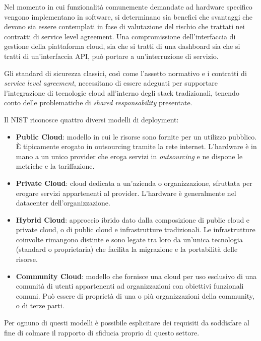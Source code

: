 \documentclass[../main.tex]{subfiles}
\begin{document}
Nel momento in cui funzionalità comunemente demandate ad hardware specifico vengono implementano in software, si determinano sia benefici che svantaggi che devono sia essere contemplati in fase di valutazione del rischio che trattati nei contratti di service level agreement. Una compromissione dell'interfaccia di gestione della piattaforma cloud, sia che si tratti di una dashboard sia che si tratti di un'interfaccia API, può portare a un'interruzione di servizio.

Gli standard di sicurezza classici, così come l'assetto normativo e i contratti di \textit{service level agreement}, necessitano di essere adeguati per supportare l'integrazione di tecnologie cloud all'interno degli stack tradizionali, tenendo conto delle problematiche di \textit{shared responsability} presentate.

Il NIST \cite{NISTCloud} riconosce quattro diversi modelli di deployment:
\begin{itemize}
    \item \textbf{Public Cloud}: modello in cui le risorse sono fornite per un utilizzo pubblico. È tipicamente erogato in outsourcing tramite la rete internet. L'hardware è in mano a un unico provider che eroga servizi in \textit{outsourcing} e ne dispone le metriche e la tariffazione.
    \item \textbf{Private Cloud}: cloud dedicata a un'azienda o organizzazione, sfruttata per erogare servizi appartenenti al provider. L'hardware è generalmente nel datacenter dell'organizzazione.
    \item \textbf{Hybrid Cloud}: approccio ibrido dato dalla composizione di public cloud e private cloud, o di public cloud e infrastrutture tradizionali. Le infrastrutture coinvolte rimangono distinte e sono legate tra loro da un'unica tecnologia (standard o proprietaria) che facilita la migrazione e la portabilità delle risorse.
    \item \textbf{Community Cloud}: modello che fornisce una cloud per uso esclusivo di una comunità di utenti appartenenti ad organizzazioni con obiettivi funzionali comuni. Può essere di proprietà di una o più organizzazioni della community, o di terze parti.
\end{itemize}
Per ognuno di questi modelli è possibile esplicitare dei requisiti da soddisfare al fine di colmare il rapporto di sfiducia proprio di questo settore\cite{Ardagna:2015:SAC:2808687.2767005}.
\end{document}
